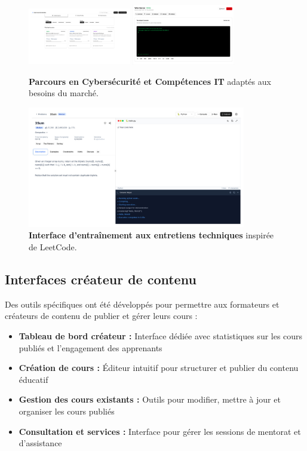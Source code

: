 \begin{figure}[h!]
  \centering
  \includegraphics[width=0.4\textwidth,keepaspectratio]{old-reports/week_4_img/syber.jpeg}
  \includegraphics[width=0.4\textwidth,keepaspectratio]{old-reports/week_4_img/it.jpeg}
  \caption{\textbf{Parcours en Cybersécurité et Compétences IT} adaptés aux besoins du marché.}
  \label{fig:specialized_paths}
\end{figure}

\begin{figure}[h!]
  \centering
  \includegraphics[width=0.85\textwidth,keepaspectratio]{old-reports/week_4_img/leetcode.jpeg}
  \caption{\textbf{Interface d'entraînement aux entretiens techniques} inspirée de LeetCode.}
  \label{fig:interview_prep}
\end{figure}

\subsection{Interfaces créateur de contenu}

Des outils spécifiques ont été développés pour permettre aux formateurs et créateurs de contenu de publier et gérer leurs cours :

\begin{itemize}
  \item \textbf{Tableau de bord créateur :} Interface dédiée avec statistiques sur les cours publiés et l'engagement des apprenants
  \item \textbf{Création de cours :} Éditeur intuitif pour structurer et publier du contenu éducatif
  \item \textbf{Gestion des cours existants :} Outils pour modifier, mettre à jour et organiser les cours publiés
  \item \textbf{Consultation et services :} Interface pour gérer les sessions de mentorat et d'assistance
\end{itemize}

